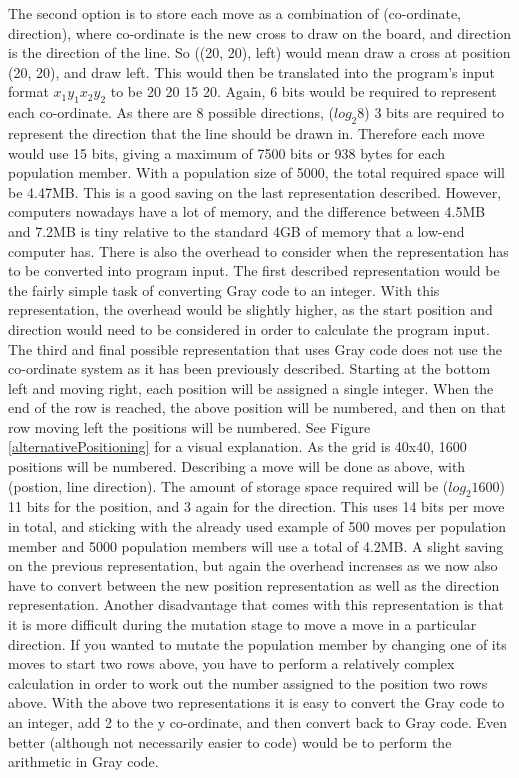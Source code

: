 \documentclass[]{report}
\begin{document}
The second option is to store each move as a combination of (co-ordinate, direction), where co-ordinate is the new cross to draw on the board, and direction is the direction of the line. So ((20, 20), left) would mean draw a cross at position (20, 20), and draw left. This would then be translated into the program's input format $x_1 y_1 x_2 y_2$ to be 20 20 15 20. Again, 6 bits would be required to represent each co-ordinate. As there are 8 possible directions, ($log_2 8$) 3 bits are required to represent the direction that the line should be drawn in. Therefore each move would use 15 bits, giving a maximum of 7500 bits or 938 bytes for each population member. With a population size of 5000, the total required space will be 4.47MB. This is a good saving on the last representation described. However, computers nowadays have a lot of memory, and the difference between 4.5MB and 7.2MB is tiny relative to the standard 4GB of memory that a low-end computer has. There is also the overhead to consider when the representation has to be converted into program input. The first described representation would be the fairly simple task of converting Gray code to an integer. With this representation, the overhead would be slightly higher, as the start position and direction would need to be considered in order to calculate the program input. \\

The third and final possible representation that uses Gray code does not use the co-ordinate system as it has been previously described. Starting at the bottom left and moving right, each position will be assigned a single integer. When the end of the row is reached, the above position will be numbered, and then on that row moving left the positions will be numbered. See Figure \ref{alternativePositioning} for a visual explanation. As the grid is 40x40, 1600 positions will be numbered. Describing a move will be done as above, with (postion, line direction). The amount of storage space required will be ($log_2 1600$) 11 bits for the position, and 3 again for the direction. This uses 14 bits per move in total, and sticking with the already used example of 500 moves per population member and 5000 population members will use a total of 4.2MB. A slight saving on the previous representation, but again the overhead increases as we now also have to convert between the new position representation as well as the direction representation. Another disadvantage that comes with this representation is that it is more difficult during the mutation stage to move a move in a particular direction. If you wanted to mutate the population member by changing one of its moves to start two rows above, you have to perform a relatively complex calculation in order to work out the number assigned to the position two rows above. With the above two representations it is easy to convert the Gray code to an integer, add 2 to the y co-ordinate, and then convert back to Gray code. Even better (although not necessarily easier to code) would be to perform the arithmetic in Gray code. \\
\end{document}
